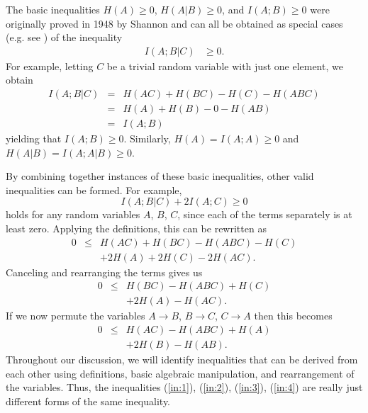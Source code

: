 \documentclass[10pt,journal]{IEEEtran}
\begin{document}
The basic inequalities
$H(A)\ge 0$, $H(A|B)\ge 0$, and $I(A;B) \ge 0$
were originally proved in 1948 by Shannon \cite{Shannon-1948} %
and can all be obtained as special cases
(e.g. see \cite{Yeung-book}) %
of the inequality
%
\begin{align}
I(A;B|C) &\ge 0.                \label{eq:55}
\end{align}
For example, letting $C$ be a trivial random variable with just one element, we obtain
\begin{eqnarray*}
I(A;B|C) &=& H(AC)+H(BC)-H(C)-H(ABC)\\
&=&H(A)+H(B)-0-H(AB)\\
&=&I(A;B)
\end{eqnarray*}
yielding that $I(A;B)\geq 0$. Similarly, $H(A)=I(A;A)\geq 0$ and $H(A|B)=I(A;A|B)\geq 0$.

By combining together instances of these basic inequalities, other valid inequalities can be formed.
For example,
\begin{equation}\label{in:1}
I(A;B|C)+2I(A;C)\geq 0
\end{equation}
holds for any random variables $A$, $B$, $C$, since each of the terms separately is at least zero.
Applying the definitions,
this can be rewritten as
\begin{eqnarray}\label{in:2}
0 &\leq& H(AC)+H(BC)-H(ABC)-H(C)\\
\nonumber &&+2H(A)+2H(C)-2H(AC).
\end{eqnarray}
Canceling and rearranging the terms gives us
\begin{eqnarray}\label{in:3}
0 &\leq&H(BC)-H(ABC)+ H(C)\\
\nonumber &&+2H(A)-H(AC).
\end{eqnarray}
If we now permute the variables $A\to B$, $B\to C$, $C\to A$ then this becomes
\begin{eqnarray}\label{in:4}
0 &\leq&H(AC)-H(ABC)+ H(A)\\
\nonumber &&+2H(B)-H(AB).
\end{eqnarray}
Throughout our discussion, we will identify inequalities that can be derived from
each other using definitions, basic algebraic manipulation, and rearrangement of the variables.
Thus, the inequalities (\ref{in:1}), (\ref{in:2}), (\ref{in:3}), (\ref{in:4}) are really
just different forms of the same inequality.
\end{document}
